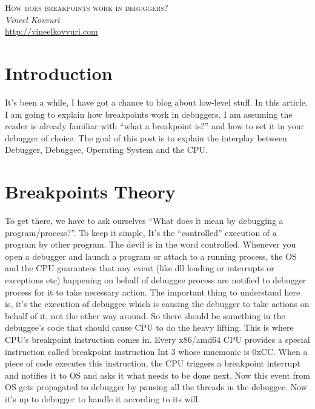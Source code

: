 \documentclass{article}
\begin{document}
\begin{titlepage}
   \begin{center}
      \Large\textsc{How does breakpoints work in debuggers?}\\
      \vspace{5mm}
      \Large\textit{Vineel Kovvuri}\\
      \url{http://vineelkovvuri.com}\\
   \end{center}
\end{titlepage}

\tableofcontents

\newpage
\section{Introduction}
It’s been a while, I have got a chance to blog about low-level stuff. In this article, I am going to explain how breakpoints work in debuggers. I am assuming the reader is already familiar with “what a breakpoint is?” and how to set it in your debugger of choice. The goal of this post is to explain the interplay between Debugger, Debuggee, Operating System and the CPU.

\section{Breakpoints Theory}
To get there, we have to ask ourselves  “What does it mean by debugging a program/process?”. To keep it simple, It’s the “controlled” execution of a program by other program. The devil is in the word controlled. Whenever you open a debugger and launch a program or attach to a running process, the OS and the CPU guarantees that any event (like dll loading or interrupts or exceptions etc) happening on behalf of debuggee process are notified to debugger process for it to take necessary action. The important thing to understand here is, it’s the execution of debuggee which is causing the debugger to take actions on behalf of it, not the other way around.  So there should be something in the debuggee’s code that should cause CPU to do the heavy lifting.  This is where CPU’s breakpoint instruction comes in. Every x86/amd64 CPU provides a special instruction called breakpoint instruction Int 3 whose mnemonic is 0xCC. When a piece of code executes this instruction, the CPU triggers a breakpoint interrupt and notifies it to OS and asks it what needs to be done next. Now this event from OS gets propagated to debugger by pausing all the threads in the debuggee. Now it’s up to debugger to handle it according to its will.
\end{document}
